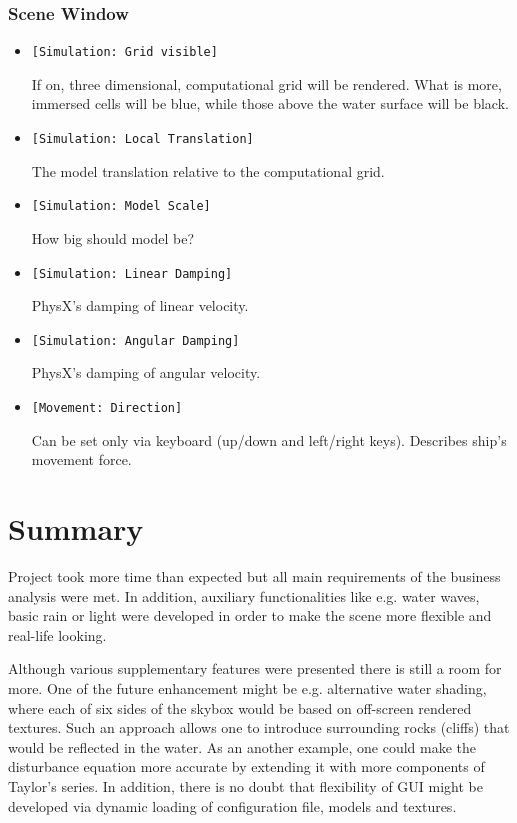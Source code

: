 \documentclass{report}
\begin{document}
\subsubsection{Scene Window}
\begin{itemize}
\item \texttt{[Simulation: Grid visible]}

If on, three dimensional, computational grid will be rendered. What is more, immersed cells will be blue, while those above the water surface will be black.

\item \texttt{[Simulation: Local Translation]}

The model translation relative to the computational grid.

\item \texttt{[Simulation: Model Scale]}

How big should model be?

\item \texttt{[Simulation: Linear Damping]}

PhysX's damping of linear velocity.

\item \texttt{[Simulation: Angular Damping]}

PhysX's damping of angular velocity.

\item \texttt{[Movement: Direction]}

Can be set only via keyboard (up/down and left/right keys). 
Describes ship's movement force.
\end{itemize}

\section{Summary}
Project took more time than expected but all main requirements of the business analysis were met. In addition, auxiliary functionalities like e.g. water waves, basic rain or light were developed in order to make the scene more flexible and real-life looking. 

Although various supplementary features were presented there is still a room for more. One of the future enhancement might be e.g. alternative water shading, where each of six sides of the skybox would be based on off-screen rendered textures. Such an approach allows one to introduce surrounding rocks (cliffs) that would be reflected in the water. As an another example, one could make the disturbance equation more accurate by extending it with more components of Taylor's series. In addition, there is no doubt that flexibility of GUI might be developed via dynamic loading of configuration file, models and textures.
\end{document}
